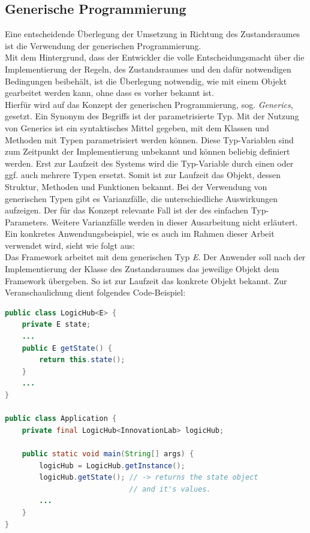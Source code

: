 \subsection{Generische Programmierung} %
Eine entscheidende Überlegung der Umsetzung in Richtung des Zustandsraumes ist die Verwendung der generischen Programmierung. 
\\
Mit dem Hintergrund, dass der Entwickler die volle Entscheidungsmacht über die Implementierung der 
Regeln, des Zustandsraumes und den dafür notwendigen Bedingungen beibehält, ist die Überlegung  
notwendig, wie mit einem Objekt gearbeitet werden kann, ohne dass es vorher bekannt ist. 
\\
\linebreak
Hierfür wird auf das Konzept der generischen Programmierung, sog. \textit{Generics}, gesetzt. Ein Synonym 
des Begriffs ist der parametrisierte Typ. Mit der Nutzung von Generics ist ein syntaktisches Mittel 
gegeben, mit dem Klassen und Methoden mit Typen parametrisiert werden können. Diese Typ-Variablen sind zum 
Zeitpunkt der Implementierung unbekannt und können beliebig definiert werden. Erst zur Laufzeit des Systems 
wird die Typ-Variable durch einen oder ggf. auch mehrere Typen ersetzt. Somit ist zur Laufzeit das 
Objekt, dessen Struktur, Methoden und Funktionen bekannt. Bei der Verwendung von generischen Typen gibt es 
Varianzfälle, die unterschiedliche Auswirkungen aufzeigen. Der für das Konzept relevante Fall ist der des 
einfachen Typ-Parameters. Weitere Varianzfälle werden in dieser Ausarbeitung nicht erläutert. 
\\
\linebreak
Ein konkretes Anwendungsbeispiel, wie es 
auch im Rahmen dieser Arbeit verwendet wird, sieht wie folgt aus:
\\
Das Framework arbeitet mit dem generischen Typ \textit{E}. Der Anwender soll nach der Implementierung der Klasse des Zustandsraumes das 
jeweilige Objekt dem Framework übergeben. So ist zur Laufzeit das konkrete Objekt bekannt. Zur Veranschaulichung dient folgendes Code-Beispiel:
\begin{lstlisting}[language=Java, frame=lines, xleftmargin=\parindent, style=algoBericht, label={code:generics}, captionpos=b, caption={Zustandsobjekt als Typ-Variable}]
public class LogicHub<E> {
    private E state;
    ...
    public E getState() {
        return this.state();
    }
    ...
}

public class Application {
    private final LogicHub<InnovationLab> logicHub;

    public static void main(String[] args) {
        logicHub = LogicHub.getInstance();
        logicHub.getState(); // -> returns the state object 
                             // and it's values.
        ...
    }
}
\end{lstlisting}
